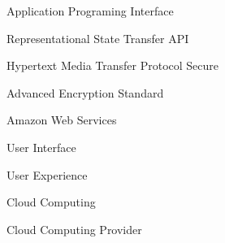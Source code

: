     {Application Programing Interface}

    {\gls{Representational State Transfer API}}

    {\gls{Hypertext Media Transfer Protocol Secure}}

    {Advanced Encryption Standard}
 
    {\gls{Amazon Web Services}}
  
    {\gls{User Interface}}

    {User Experience}

    {\gls{Cloud Computing}}

    {\gls{Cloud Computing Provider}}
